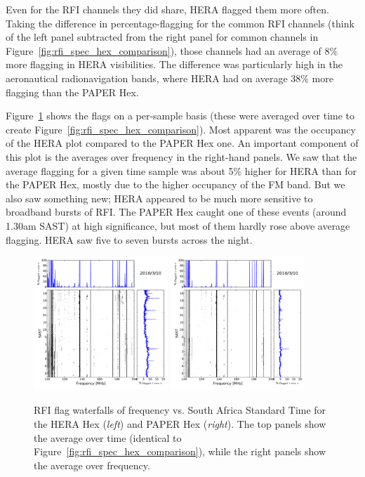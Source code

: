 Even for the RFI channels they did share, HERA flagged them more often. Taking the difference in percentage-flagging for the common RFI channels (think of the left panel subtracted from the right panel for common channels in Figure~\ref{fig:rfi_spec_hex_comparison}), those channels had an average of 8\% more flagging in HERA visibilities. The difference was particularly high in the aeronautical radionavigation bands, where HERA had on average 38\% more flagging than the PAPER Hex.

Figure~\ref{fig:rfi_hex_waterfalls} shows the flags on a per-sample basis (these were averaged over time to create Figure~\ref{fig:rfi_spec_hex_comparison}). Most apparent was the occupancy of the HERA plot compared to the PAPER Hex one. An important component of this plot is the averages over frequency in the right-hand panels. We saw that the average flagging for a given time sample was about 5\% higher for HERA than for the PAPER Hex, mostly due to the higher occupancy of the FM band. But we also saw something new; HERA appeared to be much more sensitive to broadband bursts of RFI. The PAPER Hex caught one of these events (around 1.30am SAST) at high significance, but most of them hardly rose above average flagging. HERA saw five to seven bursts across the night. 

\begin{figure}
\centering
\includegraphics[width=0.45\textwidth]{chapters/data_processing/figures/RFI_HH_wf_tzoom.pdf}
\includegraphics[width=0.45\textwidth]{chapters/data_processing/figures/RFI_PH_wf_tzoom.pdf}
\caption[RFI flag waterfalls of frequency vs. South Africa Standard Time for the HERA Hex and PAPER Hex.]{RFI flag waterfalls of frequency vs. South Africa Standard Time for the HERA Hex (\textit{left}) and PAPER Hex (\textit{right}). The top panels show the average over time (identical to Figure~\ref{fig:rfi_spec_hex_comparison}), while the right panels show the average over frequency.}
\label{fig:rfi_hex_waterfalls}
\end{figure}

